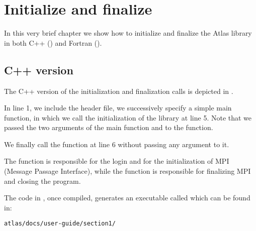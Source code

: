 \chapter{Initialize and finalize}
In this very brief chapter we show how to 
initialize and finalize the Atlas library 
in both C++ () 
and Fortran (). 



\section{C++ version}
\label{s:atlas-section1-C}
The C++ version of the \Atlas initialization and finalization 
calls is depicted in .
%

%

In line 1, we include the \Atlas header file, we successively 
specify a simple main function, in which we call the initialization 
of the \Atlas library at line 5.
Note that we passed the two arguments of the main function 
 and  to the  
function.

We finally call the \Atlas {} function 
at line 6 without passing any argument to it.

The function  is responsible for 
the login and for the initialization of MPI (Message Passage 
Interface), while the function  is 
responsible for finalizing MPI and closing the program.

The code in , once compiled, generates an executable 
called  which can be found in:
%
\begin{lstlisting}[style=BashStyle]
atlas/docs/user-guide/section1/
\end{lstlisting}
% 

